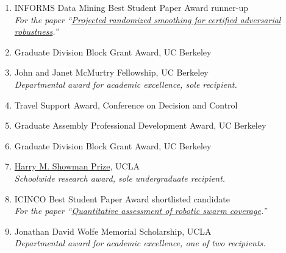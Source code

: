\begin{enumerate}[label={\arabic*.}]
	 \\
	\textit{Schoolwide award for teaching excellence.}
	\item INFORMS Data Mining Best Student Paper Award runner-up
	 \\
	\textit{For the paper ``\href{https://brendon-anderson.github.io/files/publications/pfrommer2023projected.pdf}{Projected randomized smoothing for certified adversarial robustness}.''}
	\item Graduate Division Block Grant Award, UC Berkeley
	\item John and Janet McMurtry Fellowship, UC Berkeley
	 \\
	\textit{Departmental award for academic excellence, sole recipient.}
	\item Travel Support Award, Conference on Decision and Control
	\item Graduate Assembly Professional Development Award, UC Berkeley
	\item Graduate Division Block Grant Award, UC Berkeley
	\item \href{https://samueli.ucla.edu/2018-ucla-samueli-commencement-awards/}{Harry M. Showman Prize}, UCLA
	 \\
	\textit{Schoolwide research award, sole undergraduate recipient.}
	\item ICINCO Best Student Paper Award shortlisted candidate
	 \\
	\textit{For the paper ``\href{https://arxiv.org/pdf/1806.02488.pdf}{Quantitative assessment of robotic swarm coverage}.''}
	\item Jonathan David Wolfe Memorial Scholarship, UCLA
	 \\
	\textit{Departmental award for academic excellence, one of two recipients.}
\end{enumerate}
